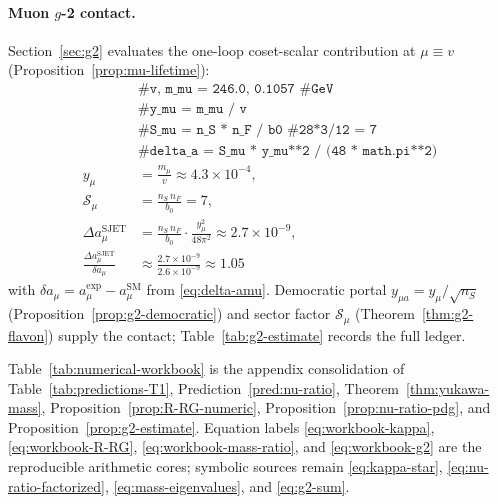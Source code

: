 \paragraph{Muon $g$-2 contact.}
Section~\ref{sec:g2} evaluates the one-loop coset-scalar contribution at
$\mu\equiv v$ (Proposition~\ref{prop:mu-lifetime}):
\begin{equation}\label{eq:workbook-g2}
\begin{aligned}
  &\texttt{\# v, m\_mu = 246.0, 0.1057  \# GeV}\\
  &\texttt{\# y\_mu = m\_mu / v}\\
  &\texttt{\# S\_mu = n\_S * n\_F / b0  \# 28*3/12 = 7}\\
  &\texttt{\# delta\_a = S\_mu * y\_mu**2 / (48 * math.pi**2)}\\
  y_\mu &= \frac{m_\mu}{v}\approx 4.3\times 10^{-4},\\
  \mathcal{S}_\mu &= \frac{n_S\,n_F}{b_0}=7,\\
  \Delta a_\mu^{\mathrm{SJET}}
  &= \frac{n_S\,n_F}{b_0}\cdot\frac{y_\mu^2}{48\pi^2}
  \approx 2.7\times 10^{-9},\\
  \frac{\Delta a_\mu^{\mathrm{SJET}}}{\delta a_\mu}
  &\approx \frac{2.7\times 10^{-9}}{2.6\times 10^{-9}}
  \approx 1.05
\end{aligned}
\end{equation}
with $\delta a_\mu=a_\mu^{\mathrm{exp}}-a_\mu^{\mathrm{SM}}$ from
\eqref{eq:delta-amu}. Democratic portal
$y_{\mu a}=y_\mu/\sqrt{n_S}$ (Proposition~\ref{prop:g2-democratic}) and
sector factor $\mathcal{S}_\mu$ (Theorem~\ref{thm:g2-flavon}) supply the
contact; Table~\ref{tab:g2-estimate} records the full ledger.

\begin{remark}
Table~\ref{tab:numerical-workbook} is the appendix consolidation of
Table~\ref{tab:predictions-T1}, Prediction~\ref{pred:nu-ratio},
Theorem~\ref{thm:yukawa-mass}, Proposition~\ref{prop:R-RG-numeric},
Proposition~\ref{prop:nu-ratio-pdg}, and Proposition~\ref{prop:g2-estimate}.
Equation labels \eqref{eq:workbook-kappa}, \eqref{eq:workbook-R-RG},
\eqref{eq:workbook-mass-ratio}, and \eqref{eq:workbook-g2} are the reproducible
arithmetic cores; symbolic sources remain \eqref{eq:kappa-star},
\eqref{eq:nu-ratio-factorized}, \eqref{eq:mass-eigenvalues}, and
\eqref{eq:g2-sum}.
\end{remark}
